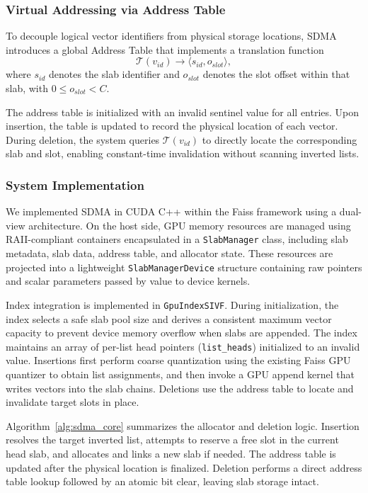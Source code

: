 \documentclass[sigconf,nonacm]{acmart}
\theoremstyle{plain}
\theoremstyle{definition}
\theoremstyle{remark}
\begin{document}
\subsubsection{Virtual Addressing via Address Table}

To decouple logical vector identifiers from physical storage locations, SDMA introduces a global Address Table that implements a translation function
\begin{equation}
    \mathcal{T}(v_{id}) \rightarrow \langle s_{id}, o_{slot} \rangle,
\end{equation}
where $s_{id}$ denotes the slab identifier and $o_{slot}$ denotes the slot offset within that slab, with $0 \le o_{slot} < C$.

The address table is initialized with an invalid sentinel value for all entries. Upon insertion, the table is updated to record the physical location of each vector. During deletion, the system queries $\mathcal{T}(v_{id})$ to directly locate the corresponding slab and slot, enabling constant-time invalidation without scanning inverted lists.

\subsubsection{System Implementation}

We implemented SDMA in CUDA C++ within the Faiss framework using a dual-view architecture. On the host side, GPU memory resources are managed using RAII-compliant containers encapsulated in a \texttt{SlabManager} class, including slab metadata, slab data, address table, and allocator state. These resources are projected into a lightweight \texttt{SlabManagerDevice} structure containing raw pointers and scalar parameters passed by value to device kernels.

Index integration is implemented in \texttt{GpuIndexSIVF}. During initialization, the index selects a safe slab pool size and derives a consistent maximum vector capacity to prevent device memory overflow when slabs are appended. The index maintains an array of per-list head pointers (\texttt{list\_heads}) initialized to an invalid value. Insertions first perform coarse quantization using the existing Faiss GPU quantizer to obtain list assignments, and then invoke a GPU append kernel that writes vectors into the slab chains. Deletions use the address table to locate and invalidate target slots in place.

Algorithm~\ref{alg:sdma_core} summarizes the allocator and deletion logic. Insertion resolves the target inverted list, attempts to reserve a free slot in the current head slab, and allocates and links a new slab if needed. The address table is updated after the physical location is finalized. Deletion performs a direct address table lookup followed by an atomic bit clear, leaving slab storage intact.
\end{document}
